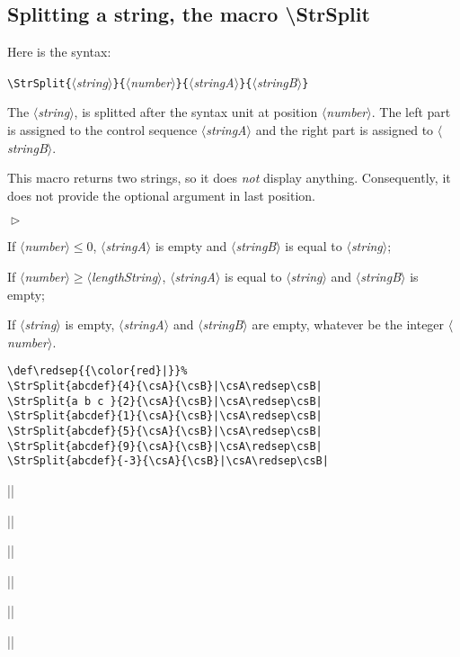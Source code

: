 \documentclass[english,a4paper,10pt]{article}
\newcommand\argu[1]{$\langle$\textit{#1}$\rangle$}
\newcommand\ARGU[1]{\texttt{\{}\argu{#1}\texttt{\}}}
\newenvironment{Conditions}[1][1cm]%
{\begin{list}%
	{$\vartriangleright$}%
	{\setlength{\leftmargin}{#1}
	 \setlength{\itemsep}{0pt}
	 \setlength{\parsep}{0pt}
	 \setlength{\topsep}{2ptplus3ptminus2pt}
	}}%
{\end{list}}
\newcommand\US{syntax unit\xspace}
\newcommand\styleexercice{\footnotesize}
\newcommand\verbinline{\lstinline[basicstyle=\normalsize\ttfamily]}
\begin{document}
\subsection{Splitting a string, the macro {\ttfamily\textbackslash StrSplit}}
\label{StrSplit}
Here is the syntax:\smallskip

\verbinline|\StrSplit|\ARGU{string}\ARGU{number}\ARGU{stringA}\ARGU{stringB}
\smallskip

The \argu{string}, is splitted after the \US at position \argu{number}. The left part is assigned to the control sequence \argu{stringA} and the right part is assigned to \argu{stringB}.\par
This macro returns two strings, so it does \emph{not} display anything. Consequently, it does not provide the optional argument in last position.\medskip

\begin{Conditions}
	\item If \argu{number}${}\leqslant0$, \argu{stringA} is empty and \argu{stringB} is equal to \argu{string};
	\item If \argu{number}${}\geqslant$\argu{lengthString}, \argu{stringA} is equal to \argu{string} and \argu{stringB} is empty;
	\item If \argu{string} is empty, \argu{stringA} and \argu{stringB} are empty, whatever be the integer \argu{number}.
\end{Conditions}

\begin{minipage}[c]{0.65\linewidth}

\begin{lstlisting}
\def\redsep{{\color{red}|}}%
\StrSplit{abcdef}{4}{\csA}{\csB}|\csA\redsep\csB|
\StrSplit{a b c }{2}{\csA}{\csB}|\csA\redsep\csB|
\StrSplit{abcdef}{1}{\csA}{\csB}|\csA\redsep\csB|
\StrSplit{abcdef}{5}{\csA}{\csB}|\csA\redsep\csB|
\StrSplit{abcdef}{9}{\csA}{\csB}|\csA\redsep\csB|
\StrSplit{abcdef}{-3}{\csA}{\csB}|\csA\redsep\csB|
\end{lstlisting}%
\end{minipage}\hfill
\begin{minipage}[c]{0.35\linewidth}
	\styleexercice
	\def\redsep{{\color{red}|}}%
	|\csA\redsep\csB|\par
	|\csA\redsep\csB|\par
	|\csA\redsep\csB|\par
	|\csA\redsep\csB|\par
	|\csA\redsep\csB|\par
	|\csA\redsep\csB|
\end{minipage}%
\end{document}
